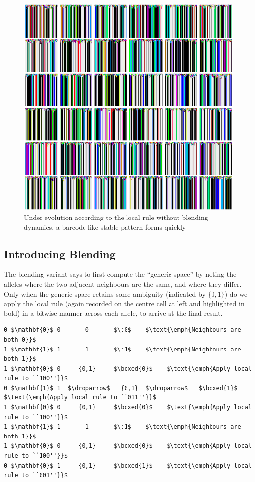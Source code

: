 \documentclass{AISB2008}
\makeatletter
\renewcommand{\boxed}[1]{\text{\fboxsep=.2em\fbox{\m@th$\displaystyle#1$}}}
\newcommand{\droparrow}{%
  \mathchoice{\raisebox{-4pt}{$\displaystyle\mapsto$}}
             {\raisebox{-4pt}{$\mapsto$}}
             {\raisebox{-2pt}{$\scriptstyle\mapsto$}}
             {\raisebox{-2pt}{$\scriptscriptstyle\mapsto$}}}
\makeatother
\begin{document}
\begin{figure}
\includegraphics[width=\columnwidth,trim = 135mm 177mm 0mm 0mm,clip=true]{paint-drips.png}
\caption{Under evolution according to the local rule without blending
  dynamics, a barcode-like stable pattern forms
  quickly\label{barcode}}
\end{figure}

\subsection{Introducing Blending} \label{introducing-blending}


The blending variant says to first compute the ``generic space'' by
noting the alleles where the two adjacent neighbours are the same, and
where they differ.  Only when the generic space retains some ambiguity
(indicated by $\{0,1\}$) do we apply the local rule (again recorded
on the centre cell at left and highlighted in bold) in a bitwise
manner across each allele, to arrive at the final result.

\lstset{
  xleftmargin=.05\columnwidth, xrightmargin=.01\columnwidth
}

\begin{lstlisting}[mathescape]
0 $\mathbf{0}$ 0       0       $\:0$    $\text{\emph{Neighbours are both 0}}$
1 $\mathbf{1}$ 1       1       $\:1$    $\text{\emph{Neighbours are both 1}}$
1 $\mathbf{0}$ 0     {0,1}     $\boxed{0}$    $\text{\emph{Apply local rule to ``100''}}$
0 $\mathbf{1}$ 1  $\droparrow$   {0,1}  $\droparrow$   $\boxed{1}$    $\text{\emph{Apply local rule to ``011''}}$
1 $\mathbf{0}$ 0     {0,1}     $\boxed{0}$    $\text{\emph{Apply local rule to ``100''}}$
1 $\mathbf{1}$ 1       1       $\:1$    $\text{\emph{Neighbours are both 1}}$
1 $\mathbf{0}$ 0     {0,1}     $\boxed{0}$    $\text{\emph{Apply local rule to ``100''}}$
0 $\mathbf{0}$ 1     {0,1}     $\boxed{1}$    $\text{\emph{Apply local rule to ``001''}}$
\end{lstlisting}
\end{document}
